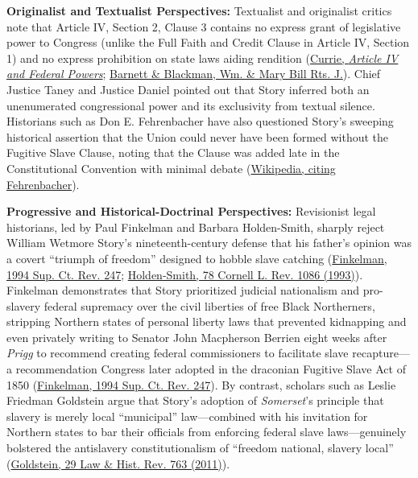 \documentclass[12pt]{article}
\begin{document}
\textbf{Originalist and Textualist Perspectives:} Textualist and originalist critics note that Article IV, Section 2, Clause 3 contains no express grant of legislative power to Congress (unlike the Full Faith and Credit Clause in Article IV, Section 1) and no express prohibition on state laws aiding rendition (\href{https://chicagounbound.uchicago.edu/cgi/viewcontent.cgi?article=6111&context=journal_articles}{Currie, \textit{Article IV and Federal Powers}}; \href{https://scholarship.law.wm.edu/cgi/viewcontent.cgi?article=2141&context=wmborj}{Barnett \& Blackman, Wm. \& Mary Bill Rts. J.}). Chief Justice Taney and Justice Daniel pointed out that Story inferred both an unenumerated congressional power and its exclusivity from textual silence. Historians such as Don E. Fehrenbacher have also questioned Story's sweeping historical assertion that the Union could never have been formed without the Fugitive Slave Clause, noting that the Clause was added late in the Constitutional Convention with minimal debate (\href{https://en.wikipedia.org/wiki/Prigg_v._Pennsylvania}{Wikipedia, citing Fehrenbacher}).

\textbf{Progressive and Historical-Doctrinal Perspectives:} Revisionist legal historians, led by Paul Finkelman and Barbara Holden-Smith, sharply reject William Wetmore Story's nineteenth-century defense that his father's opinion was a covert ``triumph of freedom'' designed to hobble slave catching (\href{https://chicagounbound.uchicago.edu/supremecourtrev/vol1994/iss1/7/}{Finkelman, 1994 Sup. Ct. Rev. 247}; \href{https://scholarship.law.cornell.edu/clr/vol78/iss6/2/}{Holden-Smith, 78 Cornell L. Rev. 1086 (1993)}). Finkelman demonstrates that Story prioritized judicial nationalism and pro-slavery federal supremacy over the civil liberties of free Black Northerners, stripping Northern states of personal liberty laws that prevented kidnapping and even privately writing to Senator John Macpherson Berrien eight weeks after \textit{Prigg} to recommend creating federal commissioners to facilitate slave recapture---a recommendation Congress later adopted in the draconian Fugitive Slave Act of 1850 (\href{https://msa.maryland.gov/megafile/msa/speccol/sc5400/sc5496/051200/051268/images/finkelman_story.pdf}{Finkelman, 1994 Sup. Ct. Rev. 247}). By contrast, scholars such as Leslie Friedman Goldstein argue that Story's adoption of \textit{Somerset}'s principle that slavery is merely local ``municipal'' law---combined with his invitation for Northern states to bar their officials from enforcing federal slave laws---genuinely bolstered the antislavery constitutionalism of ``freedom national, slavery local'' (\href{https://www.cambridge.org/core/journals/law-and-history-review/article/triumph-of-freedom-after-all-prigg-v-pennsylvania-reexamined/A0B7452002A367E4EFE865A3375F9D0E}{Goldstein, 29 Law \& Hist. Rev. 763 (2011)}).
\end{document}
